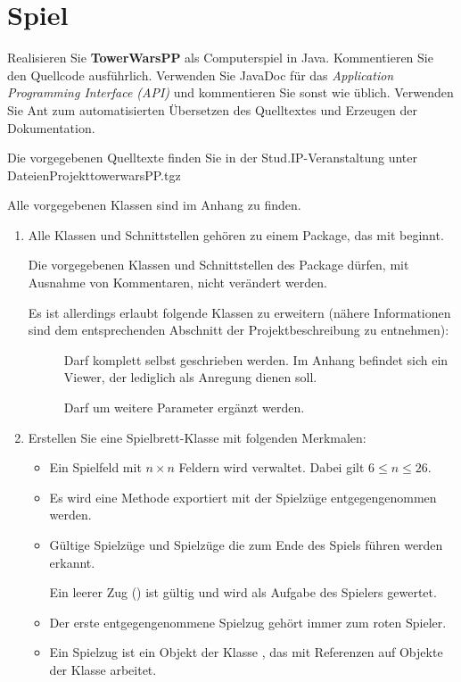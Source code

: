 \section*{Spiel}
Realisieren Sie \textbf{TowerWarsPP} als Computerspiel in Java. Kommentieren Sie den Quellcode ausführlich. Verwenden Sie JavaDoc für das \emph{Application Programming Interface (API)} und kommentieren Sie sonst wie üblich. Verwenden Sie Ant zum automatisierten Übersetzen des Quelltextes und Erzeugen der Dokumentation.

Die vorgegebenen Quelltexte finden Sie in der Stud.IP-Veranstaltung unter \\
Dateien\textrightarrow Projekt\textrightarrow towerwarsPP.tgz

Alle vorgegebenen Klassen sind im Anhang zu finden.

\begin{enumerate}
\item Alle Klassen und Schnittstellen gehören zu einem Package, das mit  beginnt.

Die vorgegebenen Klassen und Schnittstellen des Package  dürfen, mit Ausnahme von Kommentaren, nicht verändert werden. 

Es ist allerdings erlaubt folgende Klassen zu erweitern (nähere Informationen sind dem entsprechenden Abschnitt der Projektbeschreibung zu entnehmen):
\begin{description}
\item[] Darf komplett selbst geschrieben werden. Im Anhang befindet sich ein Viewer, der lediglich als Anregung dienen soll.
\item[] Darf um weitere Parameter ergänzt werden.
\end{description}

\item Erstellen Sie eine Spielbrett-Klasse mit folgenden Merkmalen:
\begin{itemize}
\item Ein Spielfeld mit $n \times n$ Feldern wird verwaltet. Dabei gilt $6 \le n \le 26$.
\item Es wird eine Methode exportiert mit der Spielzüge entgegengenommen werden.
\item Gültige Spielzüge und Spielzüge die zum Ende des Spiels führen werden erkannt.

Ein leerer Zug () ist gültig und wird als Aufgabe des Spielers gewertet.
\item Der erste entgegengenommene Spielzug gehört immer zum roten Spieler.
\item Ein Spielzug ist ein Objekt der Klasse , das mit Referenzen auf Objekte der Klasse  arbeitet.


\end{itemize}
\end{enumerate}
